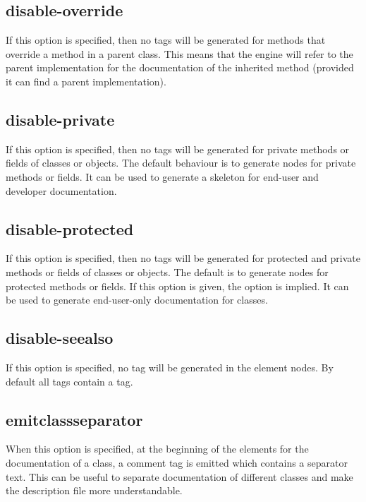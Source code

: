 \subsection{disable-override}
\label{suse:disableoverride}
If this option is specified, then no  tags will be generated
for methods that override a method in a parent class. This means that the
 engine will refer to the parent implementation for the documentation
of the inherited method (provided it can find a parent implementation).


\subsection{disable-private}
\label{suse:disableprivate}
If this option is specified, then no  tags will be generated
for private methods or fields of classes or objects. 
The default behaviour is to generate nodes for private methods or fields.
It can be used to generate a skeleton for end-user and developer
documentation.

\subsection{disable-protected}
\label{suse:disableprotected}
If this option is specified, then no  tags will be generated
for protected and private methods or fields of classes or objects. 
The default is to generate nodes for protected methods or fields. If this
option is given, the option  is implied. It can be
used to generate end-user-only documentation for classes. 


\subsection{disable-seealso}
\label{suse:msdisableseealso}
If this option is specified, no  tag will be generated in the
element nodes. By default all  tags contain a  tag.


\subsection{emitclassseparator}
\label{suse:msemitclassseparator}
When this option is specified, at the beginning of the elements for the
documentation of a class, a comment tag is emitted which contains a
separator text. This can be useful to separate documentation of different
classes and make the description file more understandable.

